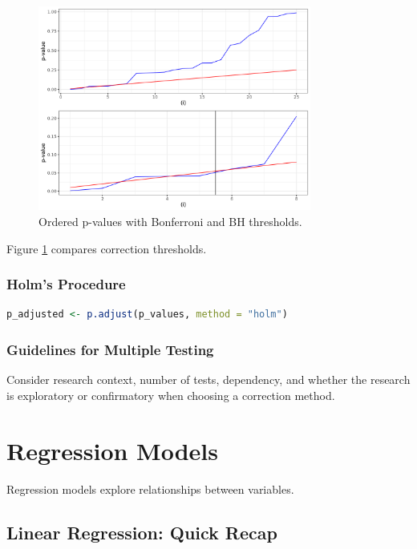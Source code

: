 \documentclass[11pt,a4paper]{article}
\begin{document}
\begin{figure}[htb]
    \centering
    \includegraphics[width=0.8\textwidth]{multiple-testing-problem.png}
    \caption{Ordered p-values with Bonferroni and BH thresholds.}
    \label{fig:p-value-thresholds}
\end{figure}

Figure \ref{fig:p-value-thresholds} compares correction thresholds.

\subsubsection{Holm's Procedure}
\begin{lstlisting}[language=R]
p_adjusted <- p.adjust(p_values, method = "holm")
\end{lstlisting}

\subsubsection{Guidelines for Multiple Testing}
\begin{tipbox}
Consider research context, number of tests, dependency, and whether the research is exploratory or confirmatory when choosing a correction method.
\end{tipbox}

\newpage

\section{Regression Models}

Regression models explore relationships between variables.

\subsection{Linear Regression: Quick Recap}
\end{document}
